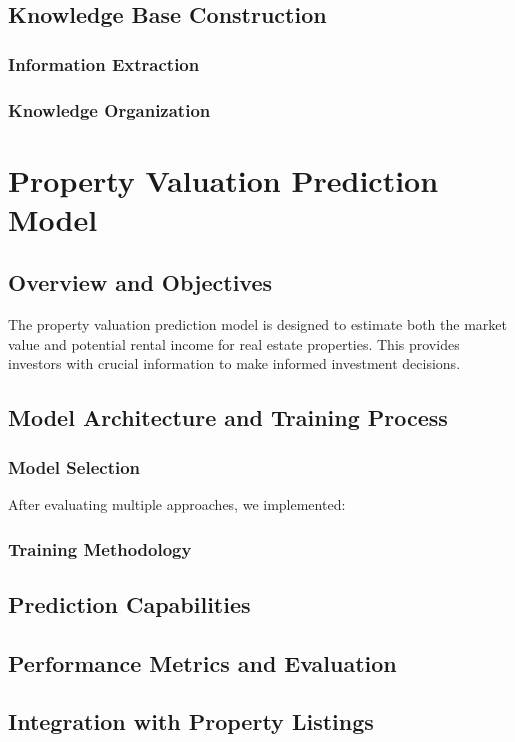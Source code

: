 \subsection{Knowledge Base Construction}
\subsubsection{Information Extraction}


\subsubsection{Knowledge Organization}

\section{Property Valuation Prediction Model}
\subsection{Overview and Objectives}
The property valuation prediction model is designed to estimate both the market value and potential rental income for real estate properties. This provides investors with crucial information to make informed investment decisions.

\subsection{Model Architecture and Training Process}
\subsubsection{Model Selection}
After evaluating multiple approaches, we implemented:


\subsubsection{Training Methodology}


\subsection{Prediction Capabilities}


\subsection{Performance Metrics and Evaluation}


\subsection{Integration with Property Listings}
